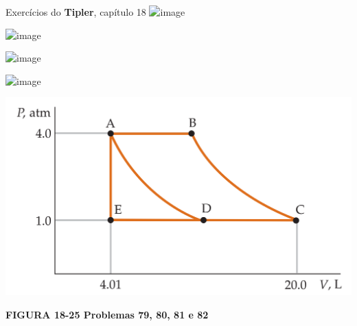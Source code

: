 \documentclass[t,%
brazilian,%
11pt,%
aspectratio=169,%
table%
]{beamer}
\begin{document}

\begin{frame}{Exercícios do \textbf{Tipler}, capítulo 18}
    \centering
    \includegraphics<+>[width=\textwidth]{images/Captura de tela de 2024-03-20 09-32-41.png}

    \includegraphics<+>[width=\textwidth]{images/Captura de tela de 2024-03-20 09-32-52.png}

    \includegraphics<+>[width=\textwidth]{images/Captura de tela de 2024-03-20 09-33-11.png}

    \includegraphics<+>[width=\textwidth]{images/Captura de tela de 2024-03-20 09-33-25.png}

    \includegraphics[width=\textwidth-133pt*\real{1.74}]{images/figura_18-25.png}

    \textbf{FIGURA 18-25 Problemas 79, 80, 81 e 82}
\end{frame}
\end{document}
